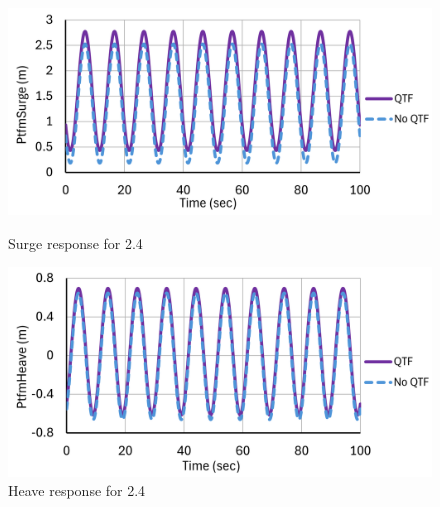 \documentclass[a4paper, 11pt]{article}
\begin{document}
\begin{figure}[H]
    \begin{minipage}{0.49\textwidth}
        \centering
        \includegraphics[width=1\textwidth]{2.4_surge.png}
        \caption{\small Surge response for 2.4} 
        \label{fig:2.4_surge}
    \end{minipage}
    \hfill
    \begin{minipage}{0.49\textwidth}
        \centering
        \vspace{-0.3cm}
        \includegraphics[width=1\textwidth]{2.4_heave.png}
        \caption{\small Heave response for 2.4}
        \label{fig:2.4_heave}
    \end{minipage}
\end{figure}
\end{document}
